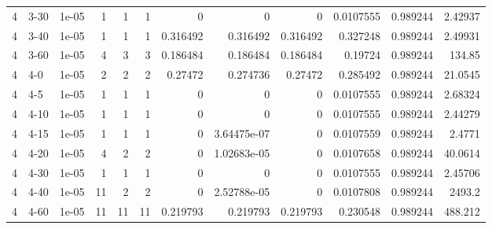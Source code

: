 \begin{tabular}{rlrrrrrrrrrr}
     4 & 3-30   &      1e-05 &           1 &                 1 &                 1 &     0           &     0           &      0           &        0.0107555 &               0.989244 &           2.42937  \\
     4 & 3-40   &      1e-05 &           1 &                 1 &                 1 &     0.316492    &     0.316492    &      0.316492    &        0.327248  &               0.989244 &           2.49931  \\
     4 & 3-60   &      1e-05 &           4 &                 3 &                 3 &     0.186484    &     0.186484    &      0.186484    &        0.19724   &               0.989244 &         134.85     \\
     4 & 4-0    &      1e-05 &           2 &                 2 &                 2 &     0.27472     &     0.274736    &      0.27472     &        0.285492  &               0.989244 &          21.0545   \\
     4 & 4-5    &      1e-05 &           1 &                 1 &                 1 &     0           &     0           &      0           &        0.0107555 &               0.989244 &           2.68324  \\
     4 & 4-10   &      1e-05 &           1 &                 1 &                 1 &     0           &     0           &      0           &        0.0107555 &               0.989244 &           2.44279  \\
     4 & 4-15   &      1e-05 &           1 &                 1 &                 1 &     0           &     3.64475e-07 &      0           &        0.0107559 &               0.989244 &           2.4771   \\
     4 & 4-20   &      1e-05 &           4 &                 2 &                 2 &     0           &     1.02683e-05 &      0           &        0.0107658 &               0.989244 &          40.0614   \\
     4 & 4-30   &      1e-05 &           1 &                 1 &                 1 &     0           &     0           &      0           &        0.0107555 &               0.989244 &           2.45706  \\
     4 & 4-40   &      1e-05 &          11 &                 2 &                 2 &     0           &     2.52788e-05 &      0           &        0.0107808 &               0.989244 &        2493.2      \\
     4 & 4-60   &      1e-05 &          11 &                11 &                11 &     0.219793    &     0.219793    &      0.219793    &        0.230548  &               0.989244 &         488.212    \\
\hline
\end{tabular}
